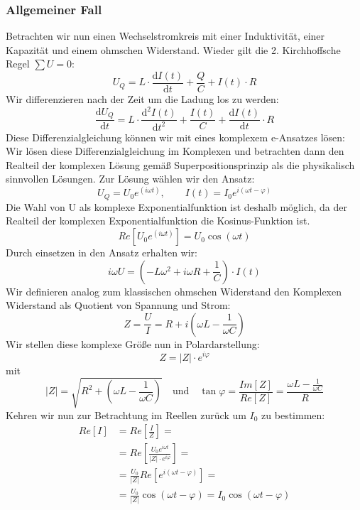 \documentclass[10pt,a4paper]{article}
\begin{document}
\subsubsection{Allgemeiner Fall}
Betrachten wir nun einen Wechselstromkreis mit einer Induktivität, einer Kapazität und einem ohmschen Widerstand. Wieder gilt die 2. Kirchhoffsche Regel $\sum U = 0$:
\begin{equation}
U_Q = L \cdot \frac{\mathrm{d}I(t)}{\mathrm{d}t} + \frac{Q}{C} + I(t) \cdot R
\end{equation}
Wir differenzieren nach der Zeit um die Ladung los zu werden:
\begin{equation}
\frac{\mathrm dU_Q}{\mathrm dt} = L \cdot \frac{\mathrm{d^2}I(t)}{\mathrm{d}t^2} + \frac{I(t)}{C} + \frac{\mathrm dI(t)}{\mathrm dt} \cdot R
\end{equation}
Diese Differenzialgleichung können wir mit eines komplexem e-Ansatzes lösen:
Wir lösen diese Differenzialgleichung im Komplexen und betrachten dann den Realteil der komplexen Lösung gemäß Superpositionsprinzip als die physikalisch sinnvollen Lösungen. Zur Lösung  wählen wir den Ansatz:
\begin{equation}
U_Q = U_0 e^{(i\omega t)},	\qquad	I(t) = I_0 e^{i(\omega t-\varphi)}
\end{equation}
Die Wahl von U als komplexe Exponentialfunktion ist deshalb möglich, da der Realteil der komplexen Exponentialfunktion die Kosinus-Funktion ist.
\begin{equation}
Re\left[ U_0 e^{(i\omega t)}\right]  = U_0 \cos{(\omega t)}
\end{equation}
Durch einsetzen in den Ansatz erhalten wir:
\begin{equation}
i\omega U = (- L \omega^2 + i \omega R  + \frac{1}{C}) \cdot I(t)
\end{equation}
Wir definieren analog zum klassischen ohmschen Widerstand den Komplexen Widerstand als Quotient von Spannung und Strom:
\begin{equation}
Z = \frac{U}{I} = R + i ( \omega L - \frac{1}{\omega C})
\end{equation}
Wir stellen diese komplexe Größe nun in Polardarstellung:
\begin{equation}
Z = |Z| \cdot e^{i\varphi}
\end{equation}
mit
\begin{equation}\label{Zpolar}
|Z| = \sqrt{ R^2 + \left( \omega L - \frac{1}{\omega C} \right) }\quad {\mathrm{und}} \quad \tan\varphi = \frac{Im[Z]}{Re[Z]} = \frac{\omega L - \frac{1}{\omega C}}{R}
\end{equation}
Kehren wir nun zur Betrachtung im Reellen zurück um $I_0$ zu bestimmen:
\begin{align}
\nonumber
Re\left[ I \right]
&= Re\left[ \frac{I}{Z} \right] =\\\nonumber
&= Re\left[ \frac{U_0 e^{i\omega t}}{|Z|\cdot e^{i\varphi}} \right] =\\\nonumber
&= \frac{U_0}{|Z|} Re\left[ e^{i(\omega t - \varphi)} \right] =\\
&= \frac{U_0}{|Z|} \cos(\omega t - \varphi) = I_0 \cos(\omega t - \varphi)
\end{align}
\end{document}
